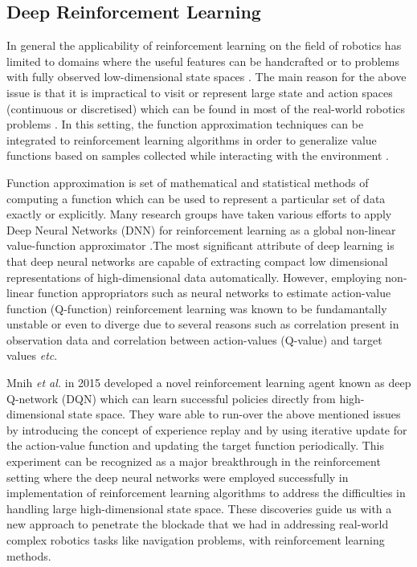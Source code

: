 \documentclass[a4paper,oneside,12pt]{report}
\begin{document}
\subsection{Deep Reinforcement Learning}

In general the applicability of reinforcement learning on the field of robotics has limited to domains \cite{R40} \cite{R41} \cite{R42} where the useful features can be handcrafted or to problems with fully observed low-dimensional state spaces \cite{R04}. The main reason for the above issue is that it is impractical to visit or represent large state and action spaces (continuous or discretised) which can be found in most of the real-world robotics problems \cite{R03}. In this setting, the function approximation techniques can be integrated to reinforcement learning algorithms \cite{R04} \cite{R04} \cite{R06} \cite{R15} in order to generalize value functions based on samples collected while interacting with the environment \cite{R03}. 

Function approximation \cite{R43} is set of  mathematical and statistical methods of computing a function which can be used to represent a particular set of data exactly or explicitly. Many research groups have taken various efforts to apply Deep Neural Networks (DNN)\cite{R40} \cite{R44} \cite{R45} \cite{R46} \cite{R47} for reinforcement learning as  a global non-linear value-function approximator \cite{R03}.The most significant attribute of deep learning is that deep neural networks are capable of extracting compact low dimensional representations of high-dimensional data automatically. However, employing non-linear function appropriators such as neural networks to estimate action-value function (Q-function) reinforcement learning was known to be fundamantally unstable or even to diverge \cite{R04} \cite{R06} due to several reasons such as correlation present in observation data and correlation between action-values (Q-value) and target values \textit{etc}. 

Mnih \textit{et al.} \cite{R04} in 2015 developed a novel reinforcement learning agent known as deep Q-network (DQN) which can learn successful policies directly from high-dimensional state space. They ware able to run-over the above mentioned issues by introducing the concept of experience replay \cite{R48} \cite{R49} and by using iterative update for the action-value function and updating the target function periodically. This experiment can be recognized as a major breakthrough in the reinforcement setting where the deep neural networks were employed successfully in implementation of reinforcement learning algorithms to address the difficulties in handling large high-dimensional state space. These discoveries guide us with a new approach to penetrate the blockade that we had in addressing real-world complex robotics tasks like navigation problems, with reinforcement learning methods.
\end{document}
